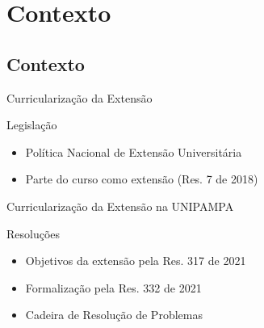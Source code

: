 \section{Contexto}
\subsection*{Contexto}

\begin{frame}{{\sffamily Curricularização da Extensão}}
  \begin{block}{Legislação}
    \begin{itemize}
      \item Política Nacional de Extensão Universitária %
      \item Parte do curso como extensão (Res. 7 de 2018) %
    \end{itemize}
  \end{block}
\end{frame}

\begin{frame}{{\sffamily Curricularização da Extensão na UNIPAMPA}}
  \begin{block}{Resoluções}
    \begin{itemize}
      \item Objetivos da extensão pela Res. 317 de 2021
      \item Formalização pela Res. 332 de 2021
      \item Cadeira de Resolução de Problemas
    \end{itemize}
  \end{block}
\end{frame}


